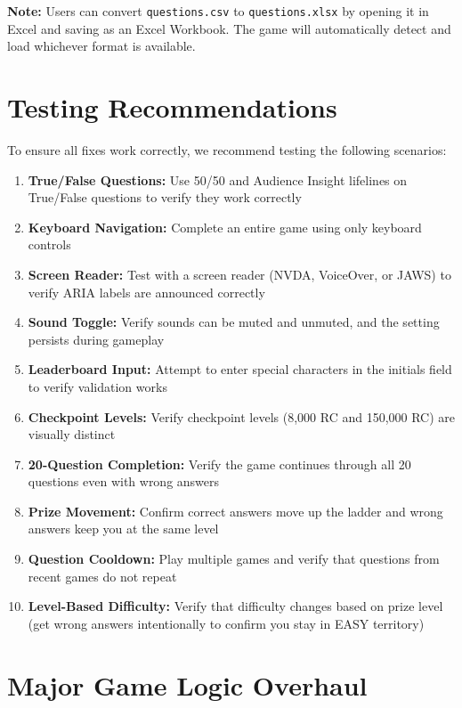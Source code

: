 \documentclass[11pt,a4paper]{article}
\begin{document}
\textbf{Note:} Users can convert \texttt{questions.csv} to \texttt{questions.xlsx} by opening it in Excel and saving as an Excel Workbook. The game will automatically detect and load whichever format is available.

\section{Testing Recommendations}

To ensure all fixes work correctly, we recommend testing the following scenarios:

\begin{enumerate}
    \item \textbf{True/False Questions:} Use 50/50 and Audience Insight lifelines on True/False questions to verify they work correctly
    \item \textbf{Keyboard Navigation:} Complete an entire game using only keyboard controls
    \item \textbf{Screen Reader:} Test with a screen reader (NVDA, VoiceOver, or JAWS) to verify ARIA labels are announced correctly
    \item \textbf{Sound Toggle:} Verify sounds can be muted and unmuted, and the setting persists during gameplay
    \item \textbf{Leaderboard Input:} Attempt to enter special characters in the initials field to verify validation works
    \item \textbf{Checkpoint Levels:} Verify checkpoint levels (8,000 RC and 150,000 RC) are visually distinct
    \item \textbf{20-Question Completion:} Verify the game continues through all 20 questions even with wrong answers
    \item \textbf{Prize Movement:} Confirm correct answers move up the ladder and wrong answers keep you at the same level
    \item \textbf{Question Cooldown:} Play multiple games and verify that questions from recent games do not repeat
    \item \textbf{Level-Based Difficulty:} Verify that difficulty changes based on prize level (get wrong answers intentionally to confirm you stay in EASY territory)
\end{enumerate}

\section{Major Game Logic Overhaul}
\end{document}
